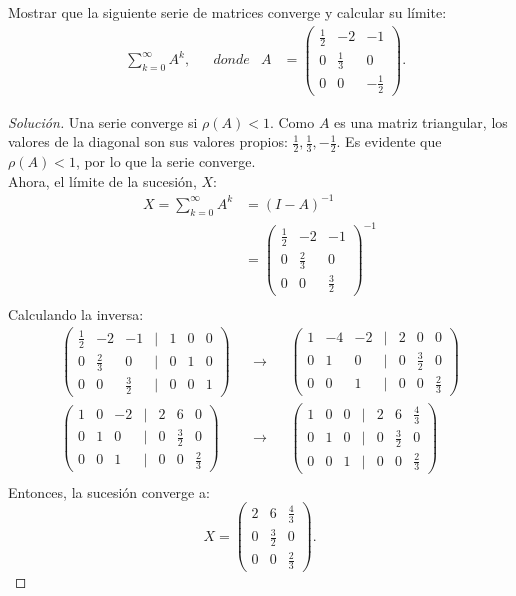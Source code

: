 \documentclass[12pt]{book}
\newenvironment{solucion}
  {\renewcommand\qedsymbol{$\square$}\begin{proof}[Solución]}
  {\end{proof}}
\begin{document}
\eje Mostrar que la siguiente serie de matrices converge y calcular su límite:
\begin{align*}
    &\sum_{k=0}^\infty A^k, & &donde & A&=\begin{pmatrix}
    \frac{1}{2}&-2&-1\\
    0&\frac{1}{3}&0\\
    0&0&-\frac{1}{2}
    \end{pmatrix}.
\end{align*}

\begin{solucion}
Una serie converge si $\rho(A)<1$. Como $A$ es una matriz triangular, los valores de la diagonal son sus valores propios: $\frac{1}{2},\frac{1}{3},-\frac{1}{2}$. Es evidente que $\rho(A)<1$, por lo que la serie converge.\\
Ahora, el límite de la sucesión, $X$:
\begin{align*}
    X=\sum_{k=0}^\infty A^k &=(I-A)^{-1}\\
    &=\begin{pmatrix}
    \frac{1}{2} & -2 & -1\\
    0 & \frac{2}{3} & 0\\
    0 & 0 & \frac{3}{2}
    \end{pmatrix}^{-1}\\
\end{align*}
Calculando la inversa:
\begin{align*}
    \begin{pmatrix}
    \frac{1}{2} & -2 & -1 & | & 1 & 0 & 0\\
    0 & \frac{2}{3} & 0 & | & 0 & 1 & 0\\
    0 & 0 & \frac{3}{2} & | & 0 & 0 & 1
    \end{pmatrix}& & \rightarrow & & \begin{pmatrix}
    1 & -4 & -2 &   | & 2 & 0 & 0\\
    0 & 1 & 0 &     | & 0 & \frac{3}{2} & 0\\
    0 & 0 & 1 &     | & 0 & 0 & \frac{2}{3}
    \end{pmatrix}\\[8pt]
    \begin{pmatrix}
    1 & 0 & -2 &    | & 2 & 6 & 0\\
    0 & 1 & 0 &     | & 0 & \frac{3}{2} & 0\\
    0 & 0 & 1 &     | & 0 & 0 & \frac{2}{3}
    \end{pmatrix} & &\rightarrow & & \begin{pmatrix}
    1 & 0 & 0 &     | & 2 & 6 & \frac{4}{3}\\
    0 & 1 & 0 &     | & 0 & \frac{3}{2} & 0\\
    0 & 0 & 1 &     | & 0 & 0 & \frac{2}{3}
    \end{pmatrix}\\
     & & & &
\end{align*}
Entonces, la sucesión converge a:
\[
X=\begin{pmatrix}
    2 & 6 & \frac{4}{3}\\
    0 & \frac{3}{2} & 0\\
    0 & 0 & \frac{2}{3}
    \end{pmatrix}.
\]
\end{solucion}
\end{document}
